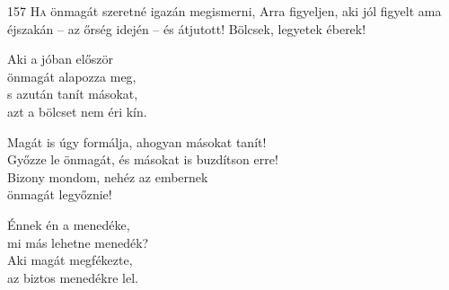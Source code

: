 
\begin{firstdhpverse}{157}
\lettrine{H}{a} {\LettrineTextFont önmagát szeretné igazán megismerni,}\newline
Arra figyeljen, aki jól figyelt\newline
ama éjszakán – az őrség idején – és átjutott!\newline
Bölcsek, legyetek éberek!
\end{firstdhpverse}

\begin{dhpverse}

 Aki a jóban először\\
önmagát alapozza meg,\\
s azután tanít másokat,\\
azt a bölcset nem éri kín.

 Magát is úgy formálja, ahogyan másokat tanít!\\
Győzze le önmagát, és másokat is buzdítson erre!\\
Bizony mondom, nehéz az embernek\\
önmagát legyőznie!

 Énnek én a menedéke,\\
mi más lehetne menedék?\\
Aki magát megfékezte,\\
az biztos menedékre lel.

\end{dhpverse}
\newpage
